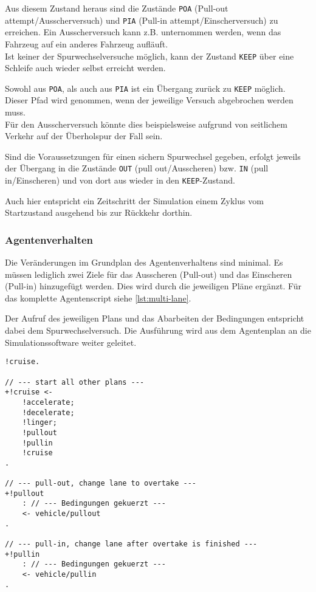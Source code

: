 Aus diesem Zustand heraus sind die Zustände \texttt{POA} (Pull-out attempt/Ausscherversuch) und \texttt{PIA} (Pull-in attempt/Einscherversuch) zu erreichen.
Ein Ausscherversuch kann z.B. unternommen werden, wenn das Fahrzeug auf ein anderes Fahrzeug aufläuft.
\\
Ist keiner der Spurwechselversuche möglich, kann der Zustand \texttt{KEEP} über eine Schleife auch wieder selbst erreicht werden.

Sowohl aus \texttt{POA}, als auch aus \texttt{PIA} ist ein Übergang zurück zu \texttt{KEEP} möglich.
Dieser Pfad wird genommen, wenn der jeweilige Versuch abgebrochen werden muss.
\\
Für den Ausscherversuch könnte dies beispielsweise aufgrund von seitlichem Verkehr auf der Überholspur der Fall sein.

Sind die Voraussetzungen für einen sichern Spurwechsel gegeben, erfolgt jeweils der Übergang in die Zustände \texttt{OUT} (pull out/Ausscheren) bzw. \texttt{IN} (pull in/Einscheren) und von dort aus wieder in den \texttt{KEEP}-Zustand.

Auch hier entspricht ein Zeitschritt der Simulation einem Zyklus vom Startzustand ausgehend bis zur Rückkehr dorthin.



\subsubsection{Agentenverhalten}
\label{sec:agentplan-multilane}

Die Veränderungen im Grundplan des Agentenverhaltens sind minimal. 
Es müssen lediglich zwei Ziele für das Ausscheren (Pull-out) und das Einscheren (Pull-in) hinzugefügt werden.
Dies wird durch die jeweiligen Pläne ergänzt.
Für das komplette Agentenscript siehe \cref{lst:multi-lane}.

Der Aufruf des jeweiligen Plans und das Abarbeiten der Bedingungen entspricht dabei dem Spurwechselversuch.
Die Ausführung wird aus dem Agentenplan an die Simulationssoftware weiter geleitet.

\begin{minipage}[hptb]{0.95\textwidth}
\begin{lstlisting}[style=asl, 
                   keywords={!pullout,!pullin}, 
                   keywords={[2]vehicle/pullout,vehicle/pullin}, 
                   keywords={[3]}, 
                   caption={Auszug aus Agentenscript: multi lane-Version},
                   label={lst:multilane-auszug}]      
!cruise.

// --- start all other plans ---
+!cruise <-
    !accelerate;
    !decelerate;
    !linger;
    !pullout
    !pullin
    !cruise
.

// --- pull-out, change lane to overtake ---
+!pullout
    : // --- Bedingungen gekuerzt ---
    <- vehicle/pullout
.

// --- pull-in, change lane after overtake is finished ---
+!pullin
    : // --- Bedingungen gekuerzt ---
    <- vehicle/pullin
.\end{lstlisting}
\end{minipage}

